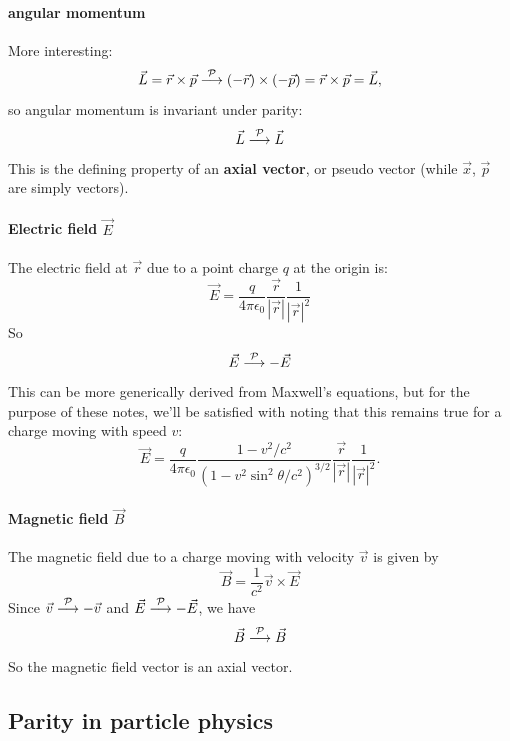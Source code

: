 \paragraph{angular momentum} More interesting:
\[ \vec{L} = \vec{r} \times \vec{p} \stackrel{\mathcal{P}}{\longrightarrow} (-\vec{r})
\times (-\vec{p}) = \vec{r} \times \vec{p} = \vec{L},
\] so angular momentum is invariant under parity:
\[\vec{L} \stackrel{\mathcal{P}}{\longrightarrow} \vec{L}\]
This is the defining property of an \textbf{axial vector}, or pseudo vector (while $\vec{x}$, $\vec{p}$ are simply vectors).
\paragraph{Electric field $\vec{E}$}
The electric field at $\vec{r}$ due to a point charge $q$ at the origin is:
\[
    \vec{E} = \frac{q}{4\pi\epsilon_0} \frac{\vec{r}}{|\vec{r}|}\frac{1}{|\vec{r}|^2}
\]
So 
\[
    \vec{E} \stackrel{\mathcal{P}}{\longrightarrow} -\vec{E}  
\]
This can be more generically derived from Maxwell's equations, but for the purpose of these notes, we'll be satisfied with noting that
this remains true for a charge moving with speed $v$:
\[
    \vec{E} = \frac{q}{4\pi \epsilon_0} \frac{1-v^2/c^2}{(1-v^2\sin^2\theta/c^2)^{3/2}}
    \frac{\vec{r}}{|\vec{r}|}
    \frac{1}{|\vec{r}|^2}.
\]
\paragraph{Magnetic field $\vec{B}$}
The magnetic field due to a charge moving with velocity $\vec{v}$ is given by
\[
    \vec{B} = \frac{1}{c^2} \vec{v} \times \vec{E} 
\]
Since $\vec{v} \stackrel{\mathcal{P}}{\longrightarrow} -\vec{v}$ and $\vec{E} \stackrel{\mathcal{P}}{\longrightarrow} -\vec{E}$, we have
\[
    \vec{B} \stackrel{\mathcal{P}}{\longrightarrow} \vec{B}
\]
So the magnetic field vector is an axial vector.


\subsection{Parity in particle physics}
\label{sec:ParityInPP}

